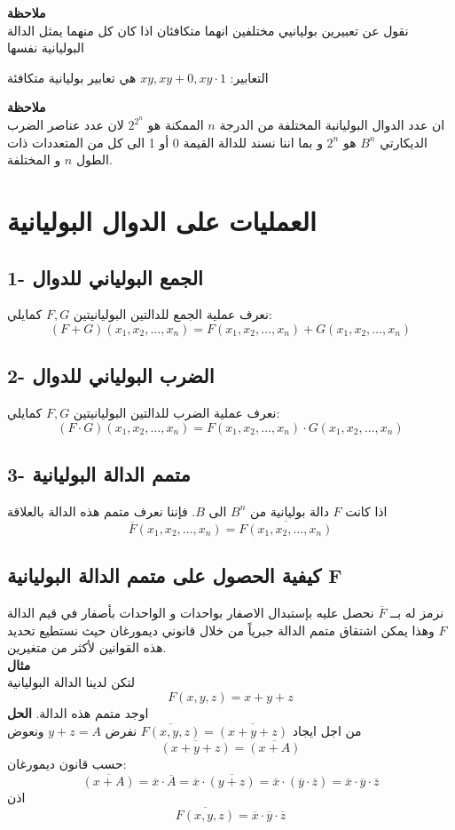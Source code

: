 \noindent
\textbf{ملاحظة}\\
\noindent
نقول عن تعبيرين بوليانيي مختلفين انهما متكافئان اذا كان كل منهما يمثل الدالة البوليانية نفسها
\begin{example}
	التعابير: $xy, xy+0, xy\cdot 1$ هي تعابير بوليانية متكافئة
\end{example}
\noindent
\textbf{ملاحظة}\\
\noindent
ان عدد الدوال البوليانبة المختلفة من الدرجة $n$ الممكنة هو $2^{2^n}$ لان عدد عناصر الضرب الديكارتي $B^n$ هو $2^n$ و بما اننا نسند للدالة القيمة 0 أو 1 الى كل من المتعددات ذات الطول $n$ و المختلفة.

\section{العمليات على الدوال البوليانية}
\subsection*{1- الجمع البولياني للدوال}
نعرف عملية الجمع للدالتين البوليانيتين $F, G$ كمايلي:
\[
(F+G)(x_1, x_2, \dots, x_n) = F(x_1, x_2, \dots, x_n) + G(x_1, x_2, \dots, x_n)
\]

\subsection*{2- الضرب البولياني للدوال}
نعرف عملية الضرب للدالتين البوليانيتين $F, G$ كمايلي:
\[
(F\cdot G)(x_1, x_2, \dots, x_n) = F(x_1, x_2, \dots, x_n) \cdot G(x_1, x_2, \dots, x_n)
\]

\subsection*{3- متمم الدالة البوليانية}
اذا كانت $F$ دالة بوليانية من $B^n$ الى $B$. فإننا نعرف متمم هذه الدالة بالعلاقة
\[
\overline{F}(x_1, x_2, \dots, x_n) = \overline{F(x_1, x_2, \dots, x_n)}
\]

\subsection*{كيفية الحصول على متمم الدالة البوليانية F}
نرمز له بــ $\overline{F}$ نحصل عليه بإستبدال الاصفار بواحدات و الواحدات بأصفار في قيم الدالة $F$ وهذا يمكن اشتقاق متمم الدالة جبرياً من خلال قانوني ديمورغان حيث نستطيع تحديد هذه القوانين لأكثر من متغيرين.\\ [5pt]
\noindent
\textbf{مثال}\\
\noindent
لتكن لدينا الدالة البوليانية
\[
F(x, y, z) = x + y + z
\]
اوجد متمم هذه الدالة.
\newpage
\noindent
\textbf{الحل}\\
\noindent
من اجل ايجاد 
$\overline{F(x, y, z)} = \overline{(x+y + z)}$
نفرض $y + z = A$ ونعوض
\[
\overline{(x + y + z)} = \overline{(x + A)}
\]
حسب قانون ديمورغان:
\[
\overline{(x+A)} = \overline{x}\cdot \overline{A} = \overline{x}\cdot\overline{(y+z)} = \overline{x}\cdot(\overline{y}\cdot\overline{z}) = \overline{x}\cdot\overline{y}\cdot\overline{z}
\]
اذن
\[
\overline{F(x, y, z)}  = \overline{x}\cdot\overline{y}\cdot\overline{z}
\]


